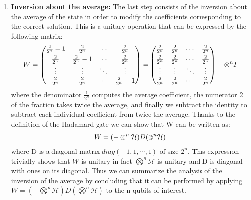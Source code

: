 \documentclass[english]{article}
\begin{document}
\begin{enumerate}
					\item \textbf{Inversion about the average:}
					The last step consists of the inversion about the average of the state in order to modify the coefficients corresponding to the correct solution. This is a unitary operation that can be expressed by the following matrix:
					\begin{equation*}
						\centering
						W =
						\begin{pmatrix}
						\frac{2}{2^n}-1 & \frac{2}{2^n} & \cdots & \frac{2}{2^n} \vspace{3pt} \\
						\frac{2}{2^n} & \frac{2}{2^n}-1 & \cdots & \frac{2}{2^n} \\
						\vdots & \vdots & \ddots & \vdots \\
						\frac{2}{2^n} & \frac{2}{2^n} & \cdots & \frac{2}{2^n}-1
						\end{pmatrix}
						=
						\begin{pmatrix}
						\frac{2}{2^n} & \frac{2}{2^n} & \cdots & \frac{2}{2^n} \vspace{3pt} \\
						\frac{2}{2^n} & \frac{2}{2^n} & \cdots & \frac{2}{2^n} \\
						\vdots & \vdots & \ddots & \vdots \\
						\frac{2}{2^n} & \frac{2}{2^n} & \cdots & \frac{2}{2^n}
						\end{pmatrix}
						- \otimes^{n}I
					\end{equation*}
					where the denominator $\frac{1}{2^n}$ computes the average coefficient, the numerator 2 of the fraction takes twice the average, and finally we subtract the identity to subtract each individual coefficient from twice the average. Thanks to the definition of the Hadamard gate we can show that W can be written as:
					\begin{equation*}
					\centering
					W = (-\otimes^n\mathcal{H})D(\otimes^n\mathcal{H})
					\end{equation*}
					where D is a diagonal matrix $diag(-1,1,\cdots,1)$ of size $2^n$. This expression trivially shows that $W$ is unitary in fact $\bigotimes^n\mathcal{H}$ is unitary and D is diagonal with ones on its diagonal. Thus we can summarize the analysis of the inversion of the average by concluding that it can be performed by applying $W = (-\bigotimes^n\mathcal{H})D(\bigotimes^n\mathcal{H})$ to the n qubits of interest.
				\end{enumerate} 
\end{document}
